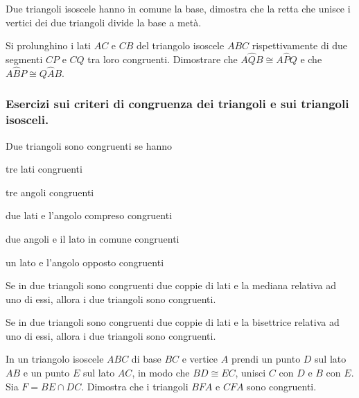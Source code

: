 \begin{multicols}{2}
\begin{esercizio}
\label{ese:2.46}
Due triangoli isoscele hanno in comune la base, dimostra che la retta 
che unisce i vertici dei due triangoli divide la base a metà.
\end{esercizio}

\begin{esercizio}
\label{ese:2.49}
Si prolunghino i lati $AC$ e $CB$ del triangolo isoscele $ABC$ 
rispettivamente di due segmenti $CP$ e $CQ$ tra loro congruenti. 
Dimostrare che $A\widehat{Q}B\cong A\widehat{P}Q$ e che 
$A\widehat{B}P\cong Q\widehat{A}B$.
\end{esercizio}

\subsubsection*{Esercizi sui criteri di congruenza dei triangoli e 
sui triangoli isosceli.}

\begin{esercizio}
\label{ese:2.54}
Due triangoli sono congruenti se hanno
\begin{enumeratea}
\item tre lati congruenti \hfill\boxV\quad\boxF
\item tre angoli congruenti \hfill\boxV\quad\boxF
\item due lati e l'angolo compreso congruenti\tab\hfill\boxV\quad\boxF
\item due angoli e il lato in comune 
congruenti\tab\hfill\boxV\quad\boxF
\item un lato e l'angolo opposto 
congruenti\tab\tab\hfill\boxV\quad\boxF
\end{enumeratea}
\end{esercizio}

\begin{esercizio}
\label{ese:2.58}
Se in due triangoli sono congruenti due coppie di lati e la mediana 
relativa ad uno di essi, allora i due triangoli sono congruenti.
\end{esercizio}

\begin{esercizio}
\label{ese:2.59}
Se in due triangoli sono congruenti due coppie di lati e la 
bisettrice relativa ad uno di essi, allora i due triangoli sono 
congruenti.
\end{esercizio}

\begin{esercizio}
\label{ese:2.63}
In un triangolo isoscele $ABC$ di base $BC$ e vertice $A$ prendi un 
punto $D$ sul lato $AB$ e un punto $E$ sul lato $AC$, in modo che 
$BD\cong EC$, unisci $C$ con $D$ e $B$ con $E$. Sia $F=BE\cap DC$. 
Dimostra che i triangoli $BFA$ e $CFA$ sono congruenti.
\end{esercizio}


\end{multicols}
